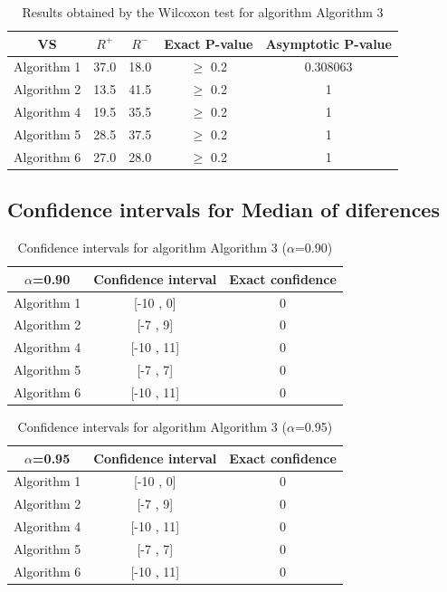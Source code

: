 \documentclass[a4paper,10pt]{article}
\begin{document}
\begin{table}[!htp]
\centering\small
\begin{tabular}{
|c|c|c|c|c|}
\hline
 VS & $R^{+}$ & $R^{-}$ & Exact P-value & Asymptotic P-value \\ \hline 
Algorithm 1 & 37.0 & 18.0 & $\geq$ 0.2 & 0.308063\\ \hline 
Algorithm 2 & 13.5 & 41.5 & $\geq$ 0.2 & 1\\ \hline 
Algorithm 4 & 19.5 & 35.5 & $\geq$ 0.2 & 1\\ \hline 
Algorithm 5 & 28.5 & 37.5 & $\geq$ 0.2 & 1\\ \hline 
Algorithm 6 & 27.0 & 28.0 & $\geq$ 0.2 & 1\\ \hline 

\end{tabular}
\caption{Results obtained by the Wilcoxon test for algorithm Algorithm 3}
\end{table}

\subsection{Confidence intervals for Median of diferences}

\begin{table}[!htp]
\centering\small
\begin{tabular}{
|c|c|c|}
\hline
 $\alpha$=0.90 & Confidence interval & Exact confidence \\ \hline 
Algorithm 1 & [-10 , 0] & 0\\ \hline 
Algorithm 2 & [-7 , 9] & 0\\ \hline 
Algorithm 4 & [-10 , 11] & 0\\ \hline 
Algorithm 5 & [-7 , 7] & 0\\ \hline 
Algorithm 6 & [-10 , 11] & 0\\ \hline 

\end{tabular}
\caption{Confidence intervals for algorithm Algorithm 3 ($\alpha$=0.90)}
\end{table}
\begin{table}[!htp]
\centering\small
\begin{tabular}{
|c|c|c|}
\hline
 $\alpha$=0.95 & Confidence interval & Exact confidence \\ \hline 
Algorithm 1 & [-10 , 0] & 0\\ \hline 
Algorithm 2 & [-7 , 9] & 0\\ \hline 
Algorithm 4 & [-10 , 11] & 0\\ \hline 
Algorithm 5 & [-7 , 7] & 0\\ \hline 
Algorithm 6 & [-10 , 11] & 0\\ \hline 

\end{tabular}
\caption{Confidence intervals for algorithm Algorithm 3 ($\alpha$=0.95)}
\end{table}
\end{document}
